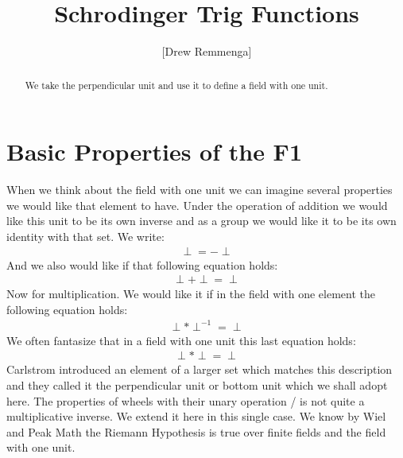 \documentclass[10pt, oneside]{article}
\title{Schrodinger Trig Functions}
\author{[Drew Remmenga]}
\begin{document}
\maketitle
\begin{abstract}
    We take the perpendicular unit and use it to define a field with one unit. 
\end{abstract}
\section{Basic Properties of the F1}
    When we think about the field with one unit we can imagine several properties we would like that element to have. 
    Under the operation of addition we would like this unit to be its own inverse and as a group we would like it to be its own identity with that set.
    We write:
    \begin{align}
        \perp = -\perp \label{add:inv}
    \end{align}
    And we also would like if that following equation holds:
    \begin{align}
        \perp + \perp = \perp \label{add:id}
    \end{align}
    Now for multiplication. We would like it if in the field with one element the following equation holds:
    \begin{align}
        \perp * \perp^{-1} = \perp \label{mult:id}
    \end{align}
    We often fantasize that in a field with one unit this last equation holds:
    \begin{align}
        \perp * \perp = \perp \label{mult:inv}
    \end{align}
    Carlstrom introduced an element of a larger set which matches this description \cite{Carlstrom2001Wheels} and they called it the perpendicular unit or bottom unit which we shall adopt here.
    The properties of wheels with their unary operation / is not quite a multiplicative inverse. We extend it here in this single case. 
    We know by Wiel \cite{milne2015riemannhypothesisfinitefields} and Peak Math \cite{youtube:f1} the Riemann Hypothesis is true over finite fields and the field with one unit. 
\end{document}
